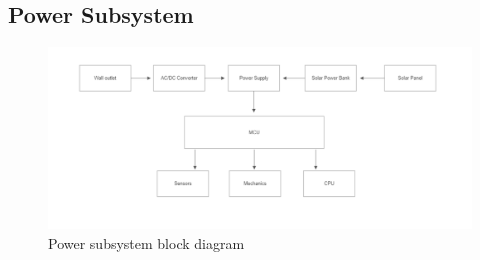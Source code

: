 \subsection{Power Subsystem}
\begin{figure}[H]
    \centering
    \caption{Power subsystem block diagram}
    \includegraphics[width=\textwidth]{images/PowerSystemBlock.png}
\end{figure}